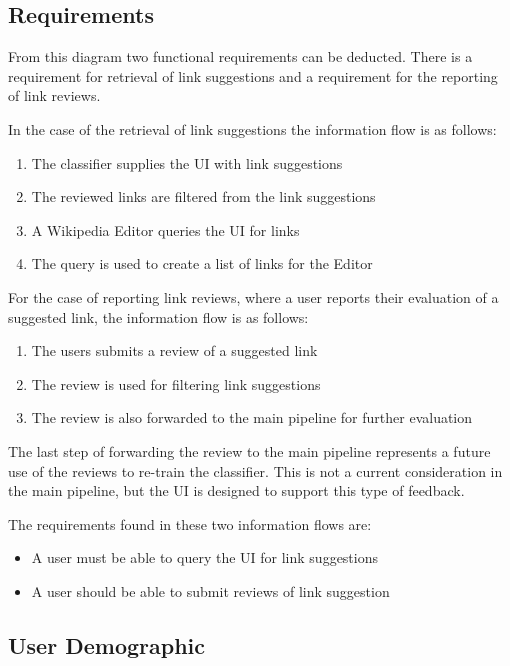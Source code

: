 \subsection{Requirements}

From this diagram two functional requirements can be deducted. There is a requirement for retrieval of link suggestions and a requirement for the reporting of link reviews.

In the case of the retrieval of link suggestions the information flow is as follows:

\begin{enumerate}
	\item The classifier supplies the UI with link suggestions
	\item The reviewed links are filtered from the link suggestions
	\item A Wikipedia Editor queries the UI for links
	\item The query is used to create a list of links for the Editor
\end{enumerate}

For the case of reporting link reviews, where a user reports their evaluation of a suggested link, the information flow is as follows:

\begin{enumerate}
	\item The users submits a review of a suggested link
	\item The review is used for filtering link suggestions
	\item The review is also forwarded to the main pipeline for further evaluation
\end{enumerate}

The last step of forwarding the review to the main pipeline represents a future use of the reviews to re-train the classifier. This is not a current consideration in the main pipeline, but the UI is designed to support this type of feedback.

The requirements found in these two information flows are:

\begin{itemize}
	\item A user must be able to query the UI for link suggestions
	\item A user should be able to submit reviews of link suggestion
\end{itemize}

\subsection{User Demographic}

